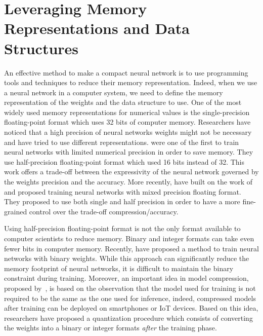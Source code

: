 \section{Leveraging Memory Representations and Data Structures}
\label{section:p1-ch3-leveraging_memory_representations_and_data_structures}


An effective method to make a compact neural network is to use programming tools and techniques to reduce their memory representation. 
Indeed, when we use a neural network in a computer system, we need to define the memory representation of the weights and the data structure to use.
One of the most widely used memory representations for numerical values is the single-precision floating-point format which uses 32 bits of computer memory.
Researchers have noticed that a high precision of neural networks weights might not be necessary and have tried to use different representations.
\citet{gupta2015deep} were one of the first to train neural networks with limited numerical precision in order to save memory.
They use half-precision floating-point format which used 16 bits instead of 32.
This work offers a trade-off between the expressivity of the neural network governed by the weights precision and the accuracy.
More recently, \citet{micikevicius2018mixed} have built on the work of~\citet{gupta2015deep} and proposed training neural networks with mixed precision floating format.
They proposed to use both single and half precision in order to have a more fine-grained control over the trade-off compression/accuracy.

Using half-precision floating-point format is not the only format available to computer scientists to reduce memory.
Binary and integer formats can take even fewer bits in computer memory.
Recently, \citet{courbariaux2015binaryconnect} have proposed a method to train neural networks with binary weights.
While this approach can significantly reduce the memory footprint of neural networks, it is difficult to maintain the binary constraint during training. 
Moreover, an important idea in model compression, proposed by~\citet{bucilua2006model}, is based on the observation that the model used for training is not required to be the same as the one used for inference, indeed, compressed models after training can be deployed on smartphones or IoT devices.
Based on this idea, researchers \cite{mellempudi2017ternary,rastegariECCV16} have proposed a quantization procedure which consists of converting the weights into a binary or integer formats \emph{after} the training phase. 


